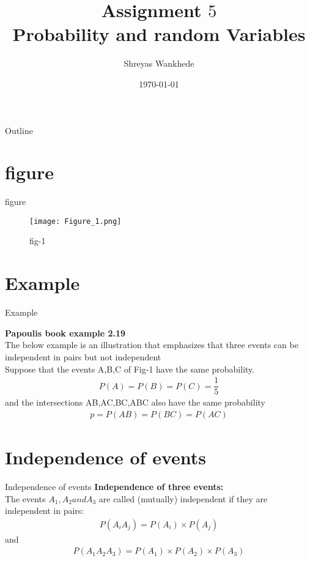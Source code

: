 \documentclass{beamer}
\title{Assignment $5$\\ Probability and random Variables}
\institute{Indian Institute of Technology Hyderabad}
\author{Shreyas Wankhede}
\date{\today}
\begin{document}
\begin{frame}
\titlepage 
\end{frame}

\logo{}


\begin{frame}{Outline}
    \tableofcontents
\end{frame}



\section{figure}
\begin{frame}{figure}
\begin{figure}
  \texttt{[image: Figure\_1.png]}
  \caption{fig-1}
  \label{fiure-1}
\end{figure}
\end{frame}
\section{Example}
\begin{frame}{Example}

\textbf{Papoulis book example 2.19}\\\vspace{5mm}
The below example is an illustration that emphasizes that three events can be independent in pairs but not independent\\\vspace{3mm}
Suppose that the events A,B,C of Fig-1 have the same probability.\\
\begin{align}
    P(A)=P(B)=P(C)=\dfrac{1}{5}\nonumber
\end{align}
and the intersections AB,AC,BC,ABC also have the same probability
\begin{align}
    p=P(AB)=P(BC)=P(AC)\nonumber
\end{align}



\end{frame}

\section{Independence of events}
\begin{frame}{Independence of events}
 \textbf{Independence of three events:}\\
 The events $A_1, A_2 and A_3$ are called (mutually) independent if they are independent in pairs:\\
 \begin{align}
     P(A_iA_j)=P(A_i)\times P(A_j)\label{eq:1}
 \end{align}
 and
 \begin{align}
     P(A_1A_2A_3)=P(A_1)\times P(A_2)\times P(A_3)\label{eq:2}
 \end{align}
\end{frame}
\end{document}
